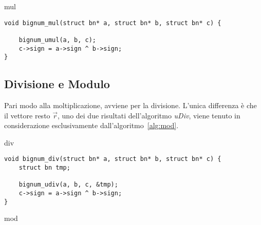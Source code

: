 \begin{algorithm}[H]
	\caption{mul}
	\label{alg:mul}
	\DontPrintSemicolon
\end{algorithm}

\begin{lstlisting}[basicstyle=\ttfamily\small, backgroundcolor=\color{bgCode}]
void bignum_mul(struct bn* a, struct bn* b, struct bn* c) {
    
    bignum_umul(a, b, c);
    c->sign = a->sign ^ b->sign;
}
\end{lstlisting}

%
\subsection{Divisione e Modulo}
%

Pari modo alla moltiplicazione, avviene per la divisione. L'unica differenza è che il vettore resto $\vec{r}$, uno dei due risultati dell'algoritmo \emph{uDiv}, viene tenuto in considerazione esclusivamente dall'algoritmo~\ref{alg:mod}. 

\begin{algorithm}[H]
	\caption{div}
	\label{alg:div}
	\DontPrintSemicolon
\end{algorithm}

\begin{lstlisting}[basicstyle=\ttfamily\small, backgroundcolor=\color{bgCode}]
void bignum_div(struct bn* a, struct bn* b, struct bn* c) {
    struct bn tmp;
    
    bignum_udiv(a, b, c, &tmp);
    c->sign = a->sign ^ b->sign;
}
\end{lstlisting}

\begin{algorithm}[H]
	\caption{mod}
	\label{alg:mod}
	\DontPrintSemicolon
\end{algorithm}

